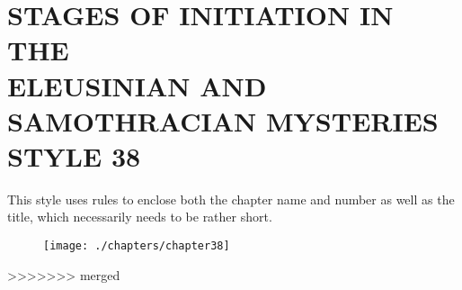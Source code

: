 \chapter{STAGES OF INITIATION IN THE\\ ELEUSINIAN AND\\ SAMOTHRACIAN MYSTERIES\\STYLE 38}

This style uses rules to enclose both the chapter name and number as well as the title, which necessarily needs to be rather short.
\medskip

\begin{figure}[ht]
\centering
\texttt{[image: ./chapters/chapter38]}
\end{figure}

>>>>>>> merged
